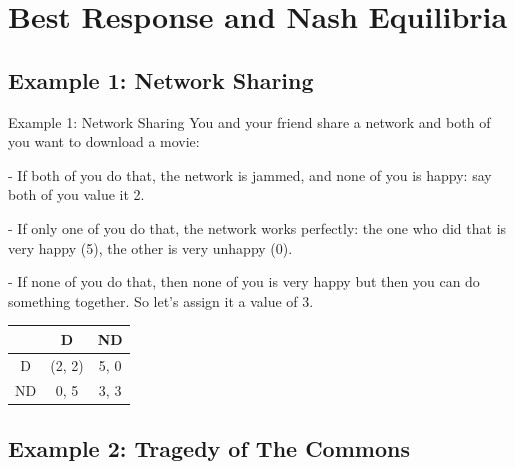 \documentclass{beamer}
\begin{document}
\section{Best Response and Nash Equilibria}

\subsection{Example 1: Network Sharing}

\begin{frame}{Example 1: Network Sharing}
You and your friend share a network and both of you want to download a movie:

- If both of you do that, the network is jammed, and none of you is happy: say both of you value it 2.

- If only one of you do that, the network works perfectly: the one who did that is very happy (5), the other is very unhappy (0).

- If none of you do that, then none of you is very happy but then you can do something together. So let's assign it a value of 3. 
    \begin{table}[]
        \begin{tabular}{c|c|c|}
        \cline{2-3}
                                 & D    & ND    \\ \hline
        \multicolumn{1}{|c|}{D}  & \alert{(2, 2)} & 5, 0 \\ \hline
        \multicolumn{1}{|c|}{ND} & 0, 5 & 3, 3 \\ \hline
        \end{tabular}
    \end{table}
\end{frame}

\subsection{Example 2: Tragedy of The Commons}
\end{document}
